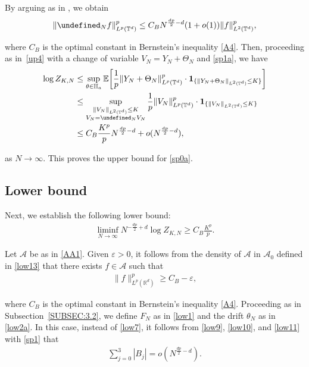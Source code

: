 \documentclass[letterpaper, 11pt,  reqno]{amsart}
\newcommand{\noi}{\noindent}
\newcommand{\R}{\mathbb{R}}
\newcommand{\T}{\mathbb{T}}
\let\P= \undefined
\newcommand{\P}{\mathbf{P}}
\newcommand{\E}{\mathbb{E}}
\newcommand{\eps}{\varepsilon}
\newcommand{\ind}{\mathbf 1}
\numberwithin{equation}{section}
\numberwithin{theorem}{section}
\newcommand{\V}{\mathcal{V}}
\newcommand{\dr}{\theta}
\newcommand{\Dr}{\Theta}
\begin{document}
By arguing as in \cite[Lemma 2.2]{OST},  we obtain
\begin{align}\label{sp1a}
\|\P_N f \|^p_{L^{p}(\T^d)}\le C_B N^{\frac{dp}{2}-d}(1+o(1))\|f\|^{p}_{L^{2}(\T^d)},
\end{align}


\noi
where $C_B$ is the optimal constant in Bernstein's inequality  \eqref{A4}.
Then, 
proceeding as in~\eqref{up4}
with a change of variable $V_N = Y_N + \Dr _N$
and \eqref{sp1a}, 
we have 
\begin{align*}
\log Z_{K, N} 
&  \le \sup_{\dr\in \mathbb{H}_a}\E\bigg[
\frac{1}{p}\|Y_N+\Dr_N\|^p_{L^p(\T^d)} \cdot 
\ind_{\{\|Y_N+\Dr_N\|_{L^2(\T^d)}\le K\}}\bigg]\notag \\
&  \le \sup_{\substack{\|V_N \|_{L^2(\T^d)} \le K\\V_N = \P_N V_N }}
\frac{1}{p}\|V_N \|^p_{L^p(\T^d)} \cdot 
\ind_{\{\|V_N \|_{L^2(\T^d)}\le K\}}\\
& \le  C_B \frac{K^p}{p} N^{\frac{dp}{2}-d}
+ o(N^{\frac{dp}{2}-d}), 
\end{align*}

\noi
as $N \to \infty$.
This proves the upper bound for 
\eqref{sp0a}.





\subsection{Lower bound}

Next, we establish the following lower bound:
\begin{align}
\liminf_{N \to \infty}
N^{-\frac{dp}{2}+d}\log Z_{K, N}\ge C_B \frac{K^{p}}{p}.
\label{sp1b}
\end{align}


Let $\mathcal{A}$ be as in \eqref{AA1}.
Given $\eps > 0$, 
it follows from the density of $\mathcal{A}$
in $\mathcal{A}_0$ defined in \eqref{low13}
that there exists $f \in \mathcal{A}$ such that 
\begin{align}
\|f\|^p_{L^{p}(\R^d)}\ge C_B-\eps, 
\label{sp2}
\end{align}

\noi
where $C_B$ is
the optimal constant in  Bernstein's inequality \eqref{A4}.
Proceeding as in Subsection~\ref{SUBSEC:3.2}, 
we define 
$F_N$ as in \eqref{low1} 
and  the drift $\dr_N$ as in \eqref{low2a}.
In this case, instead of \eqref{low7}, 
it follows from \eqref{low9}, \eqref{low10}, and \eqref{low11}
with \eqref{sp1}
that 
\begin{align}
\sum_{j=0}^{3}|B_j|=o(N^{\frac {dp}2 - d}).
\label{sp3a}
\end{align}
\end{document}
